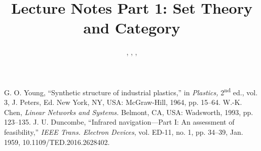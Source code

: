 \documentclass[11pt, a3paper, openany]{article}
\author{\COURSENAME, \HTG, \PHYS, \NJUPT}
\date{}
\title{Lecture Notes Part 1: Set Theory and Category}
\theoremstyle{remark}
\theoremstyle{remark}
\theoremstyle{remark}
\newenvironment{Proof of claim}
  {\begin{proof}[\normalfont \textbf{Proof of claim}]}
  {\end{proof}}
\begin{document}
\maketitle
\tableofcontents

\begin{thebibliography}{99}
 G. O. Young, ``Synthetic structure of industrial plastics,'' in \emph{Plastics,} 2\textsuperscript{nd} ed., vol. 3, J. Peters, Ed. New York, NY, USA: McGraw-Hill, 1964, pp. 15--64.
 W.-K. Chen, \emph{Linear Networks and Systems.} Belmont, CA, USA: Wadsworth, 1993, pp. 123--135.
 J. U. Duncombe, ``Infrared navigation---Part I: An assessment of feasibility,'' \emph{IEEE Trans. Electron Devices}, vol. ED-11, no. 1, pp. 34--39, Jan. 1959, 10.1109/TED.2016.2628402.
\end{thebibliography}
\end{document}
